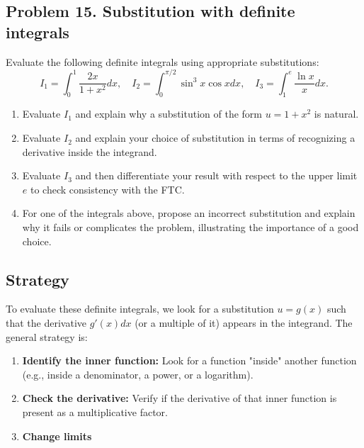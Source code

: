 \subsection{Problem 15. Substitution with definite integrals}
Evaluate the following definite integrals using appropriate substitutions:
\[I_{1}=\int_{0}^{1}\frac{2x}{1+x^{2}}dx, \quad I_{2}=\int_{0}^{\pi/2}\sin^{3}x \cos x dx, \quad I_{3}=\int_{1}^{e}\frac{\ln x}{x}dx.\]

\begin{enumerate}[label=(\alph*)]
    \item Evaluate $I_{1}$ and explain why a substitution of the form $u=1+x^{2}$ is natural.
    \item Evaluate $I_{2}$ and explain your choice of substitution in terms of recognizing a derivative inside the integrand.
    \item Evaluate $I_{3}$ and then differentiate your result with respect to the upper limit $e$ to check consistency with the FTC.
    \item For one of the integrals above, propose an incorrect substitution and explain why it fails or complicates the problem, illustrating the importance of a good choice.
\end{enumerate}

\subsection*{Strategy}
To evaluate these definite integrals, we look for a substitution $u = g(x)$ such that the derivative $g'(x)dx$ (or a multiple of it) appears in the integrand. The general strategy is:
\begin{enumerate}[label = (\alph*)]
    \item \textbf{Identify the inner function:} Look for a function "inside" another function (e.g., inside a denominator, a power, or a logarithm).
    \item \textbf{Check the derivative:} Verify if the derivative of that inner function is present as a multiplicative factor.
    \item \textbf{Change limits}
\end{enumerate}

